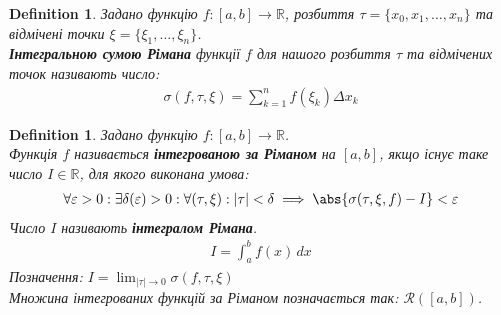 \documentclass[a4paper, 10pt]{article}
\def\huge{\displaystyle}
\theoremstyle{theoremdd}
\theoremstyle{theoremdd}
\theoremstyle{theoremdd}
\newtheorem{definition}[theorem]{Definition}
\theoremstyle{theoremdd}
\theoremstyle{theoremdd}
\theoremstyle{theoremdd}
\theoremstyle{theoremdd}
\theoremstyle{theoremdd}
\theoremstyle{theoremdd}
\begin{document}
\begin{definition}
Задано функцію $f \colon [a,b] \to \mathbb{R}$, розбиття $\tau = \{x_0,x_1,\dots,x_n\}$ та відмічені точки $\xi = \{\xi_1, \dots, \xi_n \}$.\\
\textbf{Інтегральною сумою Рімана} функції $f$ для нашого розбиття $\tau$ та відмічених точок називають число:
\begin{align*}
\sigma (f, \tau, \xi) = \sum_{k=1}^n f(\xi_k) \Delta x_k
\end{align*}
\end{definition}

\begin{figure}[H]
\centering
{}
\end{figure}

\begin{definition}
Задано функцію $f \colon [a,b] \to \mathbb{R}$.\\
Функція $f$ називається \textbf{інтегрованою за Ріманом} на $[a,b]$, якщо існує таке число $I \in \mathbb{R}$, для якого виконана умова:
\begin{align*}
\forall \varepsilon > 0: \exists \delta(\varepsilon) > 0: \forall (\tau, \xi): |\tau| < \delta \implies \abs{\sigma(\tau, \xi, f) - I} < \varepsilon
\end{align*}
Число $I$ називають \textbf{інтегралом Рімана}.
\begin{align*}
I = \int_a^b f(x)\,dx
\end{align*}
Позначення: $I = \huge\lim_{|\tau| \to 0} \sigma(f, \tau, \xi)$ \iffalse(трошки нелегально, тому що не знаю, що таке границя за базою).\fi \\ 
Множина інтегрованих функцій за Ріманом позначається так: $\mathcal{R}([a,b])$.
\end{definition}
\end{document}
